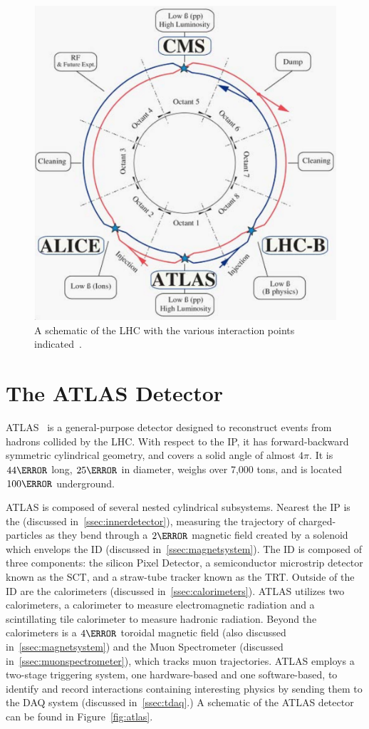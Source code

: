 \begin{figure}[!ht]
    \centering
    \includegraphics[width=.7\textwidth]{chapters/chapter2_experiment/images/lhc_interaction_points.png}
    \caption[A schematic of the LHC with the various interaction points indicated]{A schematic of the LHC with the various interaction points indicated~\cite{lhc}.}
    \label{fig:lhc}
\end{figure}


\section{The ATLAS Detector}

ATLAS~\cite{atlas-experiment} is a general-purpose detector designed to reconstruct events from hadrons collided by the \gls{LHC}. With respect to the \gls{IP}, it has forward-backward symmetric cylindrical geometry, and covers a solid angle of almost $4\pi$. It is $\unit{44}{\meter}$ long, $\unit{25}{\meter}$ in diameter, weighs over 7,000 tons, and is located $\unit{100}{\meter}$ underground. 

ATLAS is composed of several nested cylindrical subsystems. Nearest the \gls{IP} is the  (discussed in~\ref{ssec:innerdetector}), measuring the trajectory of charged-particles as they bend through a $\unit{2}{\tesla}$ magnetic field created by a solenoid which envelops the \gls{ID} (discussed in~\ref{ssec:magnetsystem}). The \gls{ID} is composed of three components: the silicon Pixel Detector, a semiconductor microstrip detector known as the \gls{SCT}, and a straw-tube tracker known as the \gls{TRT}. Outside of the \gls{ID} are the calorimeters (discussed in~\ref{ssec:calorimeters}). ATLAS utilizes two calorimeters, a  calorimeter to measure electromagnetic radiation and a scintillating tile calorimeter to measure hadronic radiation. Beyond the calorimeters is a $\unit{4}{\tesla}$ toroidal magnetic field (also discussed in~\ref{ssec:magnetsystem}) and the Muon Spectrometer (discussed in~\ref{ssec:muonspectrometer}), which tracks muon trajectories. ATLAS employs a two-stage triggering system, one hardware-based and one software-based, to identify and record interactions containing interesting physics by sending them to the \gls{DAQ} system (discussed in~\ref{ssec:tdaq}.) A schematic of the ATLAS detector can be found in Figure~\ref{fig:atlas}.

